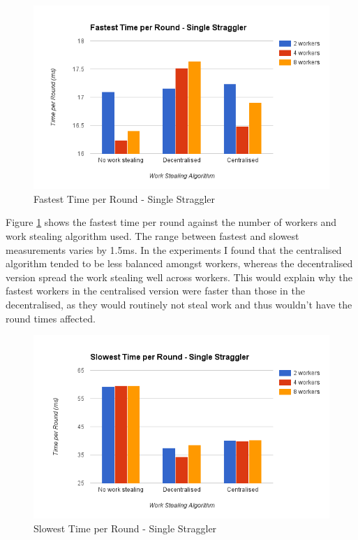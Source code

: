 \documentclass[12pt]{article}
\begin{document}
\begin{figure}[H]
  \centering
  \includegraphics[width=6in]{FastestSingle}
  \caption[]{Fastest Time per Round - Single Straggler}
  \label{FastestSingle}
\end{figure}

Figure \ref{FastestSingle} shows the fastest time per round against the number of workers and work stealing algorithm used. The range between fastest and slowest measurements varies by 1.5ms. In the experiments I found that the centralised algorithm tended to be less balanced amongst workers, whereas the decentralised version spread the work stealing well across workers. This would explain why the fastest workers in the centralised version were faster than those in the decentralised, as they would routinely not steal work and thus wouldn't have the round times affected.

\begin{figure}[H]
  \centering
  \includegraphics[width=6in]{SlowestSingle}
  \caption[]{Slowest Time per Round - Single Straggler}
  \label{SlowestSingle}
\end{figure}
\end{document}
